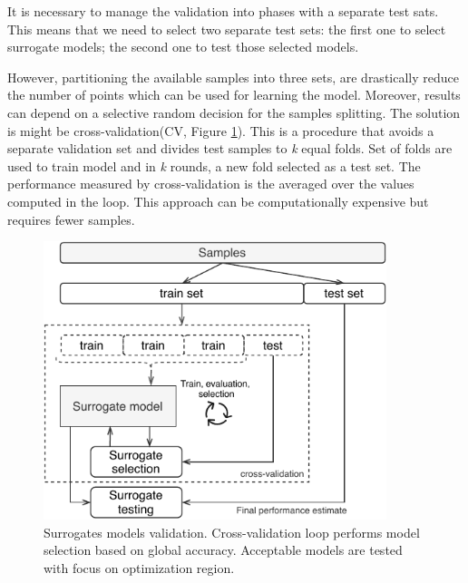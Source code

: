         
        It is necessary to manage the validation into phases with a separate test sats. This means that we need to select two separate test sets: the first one to select surrogate models; the second one to test those selected models.
        
        
        However, partitioning the available samples into three sets, are drastically reduce the number of points which can be used for learning the model. Moreover, results can depend on a selective random decision for the samples splitting. The solution is might be cross-validation(CV, Figure \ref{fig:cv}). This is a procedure that avoids a separate validation set and divides test samples to \textit{k} equal folds. Set of folds are used to train model and in \textit{k} rounds, a new fold selected as a test set. The performance measured by cross-validation is the averaged over the values computed in the loop. This approach can be computationally expensive but requires fewer samples. 

        \begin{figure}
            \centering
            \includegraphics[width=10cm]{content/images/cv}
            \caption[Cross-validation: exploration vs exploitation]{Surrogates models validation. Cross-validation loop performs model selection based on global accuracy. Acceptable models are tested with focus on optimization region. } 
            \label{fig:cv}   
        \end{figure}
    

